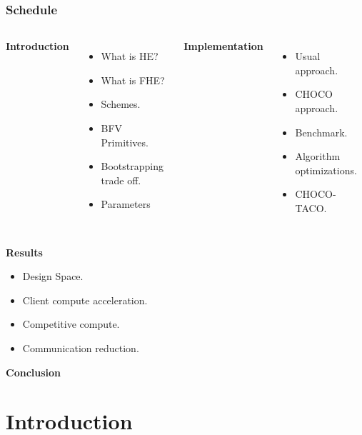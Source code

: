\documentclass[10pt,handout]{beamer}
\begin{document}
\begin{frame}[noframenumbering]
    \frametitle{Schedule}
\begin{columns}
\centering
    \textbf{Introduction}
    \begin{itemize}
        \item What is HE?
        \item What is FHE?
        \item Schemes.
        \item BFV Primitives.
        \item Bootstrapping trade off.
        \item Parameters
    \end{itemize}

\pause
\centering
    \textbf{Implementation}
    \begin{itemize}
        \item Usual approach.
        \item CHOCO approach.
        \item Benchmark.
        \item Algorithm optimizations.
        \item CHOCO-TACO.
    \end{itemize}
\end{columns}
\pause
\centering
    \textbf{Results}
  \begin{center}
    \begin{minipage}{0.5\textwidth}
      \begin{itemize}
        \item Design Space.
        \item Client compute acceleration.
        \item Competitive compute.
        \item Communication reduction.
      \end{itemize}
    \end{minipage}
  \end{center}
  \centering
    \textbf{Conclusion}
\end{frame}


\section{Introduction}
\end{document}
